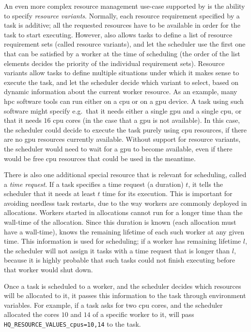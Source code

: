 An even more complex resource management use-case supported by \hyperqueue{} is the
ability to specify \emph{resource variants}. Normally, each resource requirement specified by a task
is additive; all the requested resources have to be available in order for the task to start
executing. However, \hq{} also allows tasks to define a list of resource
requirement sets (called resource variants), and let the scheduler use the first one that can be
satisfied by a worker at the time of scheduling (the order of the list elements decides the
priority of the individual requirement sets). Resource variants allow tasks to define multiple
situations under which it makes sense to execute the task, and let the scheduler decide which
variant to select, based on dynamic information about the current worker resource. As an example,
many \gls{hpc} software tools can run either on a \gls{cpu} or on a
\gls{gpu} device. A task using such software might specify e.g.\ that it needs either
a single \gls{gpu} and a single \gls{cpu}, or that it needs
$16$ \gls{cpu} cores (in the case that a \gls{gpu} is
not available). In this case, the scheduler could decide to execute the task purely using
\gls{cpu} resources, if there are no \gls{gpu} resources currently
available. Without support for resource variants, the scheduler would need to wait for a
\gls{gpu} to become available, even if there would be free \gls{cpu}
resources that could be used in the meantime.

There is also one additional special resource that is relevant for scheduling, called a
\emph{time request}. If a task specifies a time request (a duration) $t$, it
tells the scheduler that it needs at least $t$ time for its execution. This is
important for avoiding needless task restarts, due to the way \hq{} workers are
commonly deployed in allocations. Workers started in allocations cannot run for a longer time than
the wall-time of the allocation. Since this duration is known (each allocation must have a
wall-time), \hq{} knows the remaining lifetime of each such worker at any given
time. This information is used for scheduling; if a worker has remaining lifetime
$l$, the scheduler will not assign it tasks with a time request that is longer
than $l$, because it is highly probable that such tasks could not finish
executing before that worker would shut down.

Once a task is scheduled to a worker, and the scheduler decides which resources will be allocated
to it, it passes this information to the task through environment variables. For example, if a task
asks for two \gls{cpu} cores, and the scheduler allocated the cores
$10$ and $14$ of a specific worker to it,
\hq{} will pass \texttt{HQ\_RESOURCE\_VALUES\_cpus=10,14} to the task.

